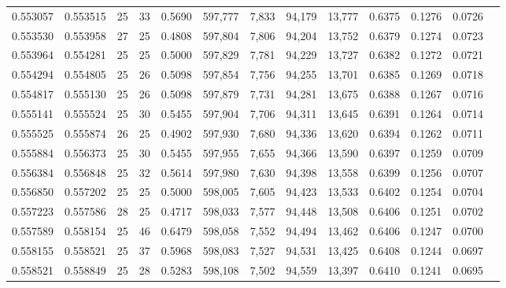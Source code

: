 \begin{tabular}{rrrrrrrrrrrrr}
0.553057 & 0.553515 &    25 &  33 &                                     0.5690 & 597,777 &   7,833 &  94,179 &  13,777 & 0.6375 & 0.1276 & 0.0726 \\
0.553530 & 0.553958 &    27 &  25 &                                     0.4808 & 597,804 &   7,806 &  94,204 &  13,752 & 0.6379 & 0.1274 & 0.0723 \\
0.553964 & 0.554281 &    25 &  25 &                                     0.5000 & 597,829 &   7,781 &  94,229 &  13,727 & 0.6382 & 0.1272 & 0.0721 \\
0.554294 & 0.554805 &    25 &  26 &                                     0.5098 & 597,854 &   7,756 &  94,255 &  13,701 & 0.6385 & 0.1269 & 0.0718 \\
0.554817 & 0.555130 &    25 &  26 &                                     0.5098 & 597,879 &   7,731 &  94,281 &  13,675 & 0.6388 & 0.1267 & 0.0716 \\
0.555141 & 0.555524 &    25 &  30 &                                     0.5455 & 597,904 &   7,706 &  94,311 &  13,645 & 0.6391 & 0.1264 & 0.0714 \\
0.555525 & 0.555874 &    26 &  25 &                                     0.4902 & 597,930 &   7,680 &  94,336 &  13,620 & 0.6394 & 0.1262 & 0.0711 \\
0.555884 & 0.556373 &    25 &  30 &                                     0.5455 & 597,955 &   7,655 &  94,366 &  13,590 & 0.6397 & 0.1259 & 0.0709 \\
0.556384 & 0.556848 &    25 &  32 &                                     0.5614 & 597,980 &   7,630 &  94,398 &  13,558 & 0.6399 & 0.1256 & 0.0707 \\
0.556850 & 0.557202 &    25 &  25 &                                     0.5000 & 598,005 &   7,605 &  94,423 &  13,533 & 0.6402 & 0.1254 & 0.0704 \\
0.557223 & 0.557586 &    28 &  25 &                                     0.4717 & 598,033 &   7,577 &  94,448 &  13,508 & 0.6406 & 0.1251 & 0.0702 \\
0.557589 & 0.558154 &    25 &  46 &                                     0.6479 & 598,058 &   7,552 &  94,494 &  13,462 & 0.6406 & 0.1247 & 0.0700 \\
0.558155 & 0.558521 &    25 &  37 &                                     0.5968 & 598,083 &   7,527 &  94,531 &  13,425 & 0.6408 & 0.1244 & 0.0697 \\
0.558521 & 0.558849 &    25 &  28 &                                     0.5283 & 598,108 &   7,502 &  94,559 &  13,397 & 0.6410 & 0.1241 & 0.0695 \\

\end{tabular}

